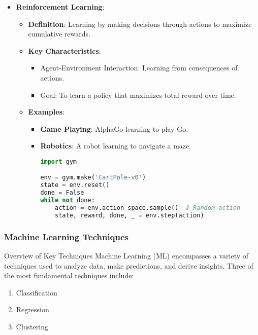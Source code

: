 \documentclass[aspectratio=169]{beamer}
\begin{document}
\begin{frame}[fragile]
\begin{itemize}
        \item \textbf{Reinforcement Learning}:
            \begin{itemize}
                \item \textbf{Definition}: Learning by making decisions through actions to maximize cumulative rewards.
                \item \textbf{Key Characteristics}:
                    \begin{itemize}
                        \item Agent-Environment Interaction: Learning from consequences of actions.
                        \item Goal: To learn a policy that maximizes total reward over time.
                    \end{itemize}
                \item \textbf{Examples}:
                    \begin{itemize}
                        \item \textbf{Game Playing}: AlphaGo learning to play Go.
                        \item \textbf{Robotics}: A robot learning to navigate a maze.
                        \begin{lstlisting}[language=Python]
import gym

env = gym.make('CartPole-v0')
state = env.reset()
done = False
while not done:
    action = env.action_space.sample()  # Random action
    state, reward, done, _ = env.step(action)
                        \end{lstlisting}
                    \end{itemize}
            \end{itemize}
    \end{itemize}
\end{frame}

\begin{frame}[fragile]
    \frametitle{Machine Learning Techniques}
    \begin{block}{Overview of Key Techniques}
        Machine Learning (ML) encompasses a variety of techniques used to analyze data, make predictions, and derive insights. Three of the most fundamental techniques include:
        \begin{enumerate}
            \item Classification
            \item Regression
            \item Clustering
        \end{enumerate}
    \end{block}
\end{frame}
\end{document}
